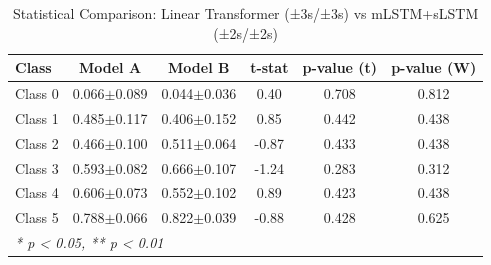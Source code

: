 \begin{table}[htbp]
\centering
\caption{Statistical Comparison: Linear Transformer (±3s/±3s) vs mLSTM+sLSTM (±2s/±2s)}
\label{tab:comparison_class_linear_transformer_±3s_±3s_vs_mlstmslstm_±2s_±2s}
\begin{tabular}{lccccc}
\toprule
\textbf{Class} & \textbf{Model A} & \textbf{Model B} & \textbf{t-stat} & \textbf{p-value (t)} & \textbf{p-value (W)} \\
\midrule
Class 0 & 0.066$\pm$0.089 & 0.044$\pm$0.036 & 0.40 & 0.708 & 0.812 \\
Class 1 & 0.485$\pm$0.117 & 0.406$\pm$0.152 & 0.85 & 0.442 & 0.438 \\
Class 2 & 0.466$\pm$0.100 & 0.511$\pm$0.064 & -0.87 & 0.433 & 0.438 \\
Class 3 & 0.593$\pm$0.082 & 0.666$\pm$0.107 & -1.24 & 0.283 & 0.312 \\
Class 4 & 0.606$\pm$0.073 & 0.552$\pm$0.102 & 0.89 & 0.423 & 0.438 \\
Class 5 & 0.788$\pm$0.066 & 0.822$\pm$0.039 & -0.88 & 0.428 & 0.625 \\
\bottomrule
\multicolumn{6}{l}{\textit{* p < 0.05, ** p < 0.01}} \\
\end{tabular}
\end{table}